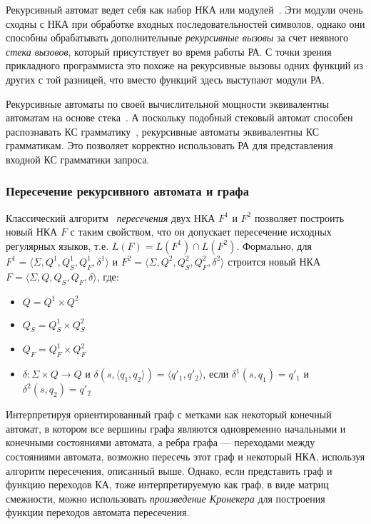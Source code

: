 Рекурсивный автомат ведет себя как набор НКА или модулей~\cite{article:recursive_state_machines}. Эти модули очень сходны с НКА при обработке входных последовательностей символов, однако они способны обрабатывать дополнительные \textit{рекурсивные вызовы} за счет неявного \textit{стека вызовов}, который присутствует во время работы РА. С точки зрения прикладного программиста это похоже на рекурсивные вызовы одних функций из других с той разницей, что вместо функций здесь выступают модули РА.

Рекурсивные автоматы по своей вычислительной мощности эквивалентны автоматам на основе стека~\cite{article:recursive_state_machines}. А поскольку подобный стековый автомат способен распознавать КС грамматику~\cite{book:automata_theory}, рекурсивные автоматы эквивалентны КС грамматикам. Это позволяет корректно использовать РА для представления входной КС грамматики запроса.

\subsubsection{Пересечение рекурсивного автомата и графа}

Классический алгоритм~\cite{book:automata_theory} \textit{пересечения} двух НКА $F^1$ и $F^2$ позволяет построить новый НКА $F$ с таким свойством, что он допускает пересечение исходных регулярных языков, т.е. $L(F) = L(F^1) \cap L(F^2)$. Формально, для $F^1 = \langle \Sigma, Q^1, Q^1_S, Q^1_F, \delta^1 \rangle$ и $F^2 = \langle \Sigma, Q^2, Q^2_S, Q^2_F, \delta^2 \rangle$ строится новый НКА $F = \langle \Sigma, Q, Q_S, Q_F, \delta \rangle$, где:

\begin{itemize}
    \item $Q = Q^1 \times Q^2$
    \item $Q_S = Q^1_S \times Q^2_S$
    \item $Q_F = Q^1_F \times Q^2_F$
    \item $\delta: \Sigma \times Q \rightarrow Q$ и $\delta(s, \langle q_1, q_2 \rangle) = \langle q'_1, q'_2 \rangle$, если $\delta^1 (s, q_1)=q'_1$ и $\delta^2 (s, q_2)=q'_2$ 
\end{itemize}

Интерпретируя ориентированный граф с метками как некоторый конечный автомат, в котором все вершины графа являются одновременно начальными и конечными состояниями автомата, а ребра графа --- переходами между состояниями автомата, возможно пересечь этот граф и некоторый НКА, используя алгоритм пересечения, описанный выше. Однако, если представить граф и функцию переходов КА, тоже интерпретируемую как граф, в виде матриц смежности, можно использовать \textit{произведение Кронекера} для построения функции переходов автомата пересечения.

